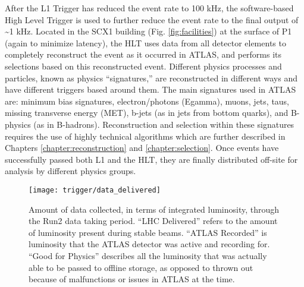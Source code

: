         After the L1 Trigger has reduced the event rate to 100 kHz, the software-based High Level Trigger is used to further reduce the event rate to the final output of \textasciitilde 1 kHz.
        Located in the SCX1 building (Fig. \ref{fig:facilities}) at the surface of P1 (again to minimize latency),
            the HLT uses data from all detector elements to completely reconstruct the event as it occurred in ATLAS,
            and performs its selections based on this reconstructed event.
        Different physics processes and particles, known as physics ``signatures,'' are reconstructed in different ways
            and have different triggers based around them. 
        The main signatures used in ATLAS are:
            minimum bias signatures, electron/photons (Egamma), muons, jets, taus,
            missing transverse energy (MET), b-jets (as in jets from bottom quarks), and B-physics (as in B-hadrons).
        Reconstruction and selection within these signatures requires the use of highly technical algorithms
            which are further described in Chapters \ref{chapter:reconstruction} and \ref{chapter:selection}.
        Once events have successfully passed both L1 and the HLT, they are finally distributed off-site for analysis by different physics groups.

        \begin{figure}[h]
            \texttt{[image: trigger/data\_delivered]}
            \caption{Amount of data collected, in terms of integrated luminosity,
                through the Run2 data taking period\cite{data_quality}.
                ``LHC Delivered'' refers to the amount of luminosity present during stable beams.
                ``ATLAS Recorded'' is luminosity that the ATLAS detector was active and recording for.
                ``Good for Physics'' describes all the luminosity that was actually able to be passed to offline storage,
                    as opposed to thrown out because of malfunctions or issues in ATLAS at the time.
            }
            \label{fig:data_delivered}
        \end{figure}

